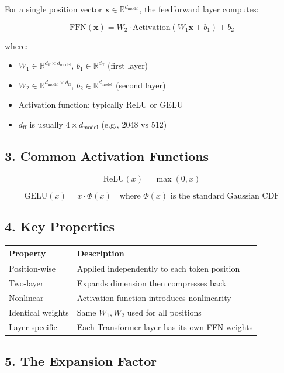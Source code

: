 \documentclass[12pt]{extarticle}
\begin{document}
For a single position vector $\mathbf{x} \in \mathbb{R}^{d_{\text{model}}}$, the feedforward layer computes:

\[
\text{FFN}(\mathbf{x}) = W_2 \cdot \text{Activation}(W_1 \mathbf{x} + b_1) + b_2
\]

where:
\begin{itemize}
    \item $W_1 \in \mathbb{R}^{d_{\text{ff}} \times d_{\text{model}}}$, $b_1 \in \mathbb{R}^{d_{\text{ff}}}$ (first layer)
    \item $W_2 \in \mathbb{R}^{d_{\text{model}} \times d_{\text{ff}}}$, $b_2 \in \mathbb{R}^{d_{\text{model}}}$ (second layer)
    \item Activation function: typically ReLU or GELU
    \item $d_{\text{ff}}$ is usually $4 \times d_{\text{model}}$ (e.g., 2048 vs 512)
\end{itemize}

\subsection*{3. Common Activation Functions}

\[
\text{ReLU}(x) = \max(0, x)
\]

\[
\text{GELU}(x) = x \cdot \Phi(x) \quad \text{where } \Phi(x) \text{ is the standard Gaussian CDF}
\]

\subsection*{4. Key Properties}

\begin{table}[h]
\centering
\begin{tabular}{lp{10cm}}
\toprule
\textbf{Property} & \textbf{Description} \\
\midrule
Position-wise & Applied independently to each token position \\
Two-layer & Expands dimension then compresses back \\
Nonlinear & Activation function introduces nonlinearity \\
Identical weights & Same $W_1, W_2$ used for all positions \\
Layer-specific & Each Transformer layer has its own FFN weights \\
\bottomrule
\end{tabular}
\end{table}

\subsection*{5. The Expansion Factor}
\end{document}
